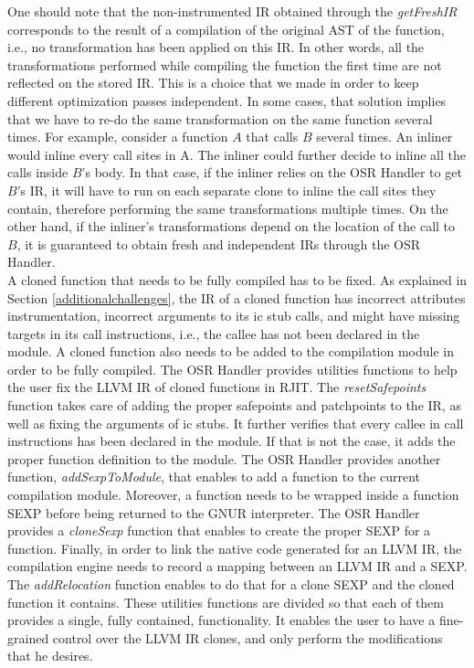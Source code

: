 One should note that the non-instrumented IR obtained through the \textit{getFreshIR} corresponds to the result of a compilation of the original AST of the function, i.e., no transformation has been applied on this IR. 
In other words, all the transformations performed while compiling the function the first time are not reflected on the stored IR. 
This is a choice that we made in order to keep different optimization passes independent.
In some cases, that solution implies that we have to re-do the same transformation on the same function several times.
For example, consider a function $A$ that calls $B$ several times.
An inliner would inline every call sites in A.
The inliner could further decide to inline all the calls inside $B$'s body.
In that case, if the inliner relies on the OSR Handler to get $B$'s IR, it will have to run on each separate clone to inline the call sites they contain, therefore performing the same transformations multiple times.
On the other hand, if the inliner's transformations depend on the location of the call to $B$, it is guaranteed to obtain fresh and independent IRs through the OSR Handler.\\

A cloned function that needs to be fully compiled has to be fixed.
As explained in Section \ref{additionalchallenges}, the IR of a cloned function has incorrect attributes instrumentation, incorrect arguments to its ic stub calls, and might have missing targets in its call instructions, i.e., the callee has not been declared in the module.
A cloned function also needs to be added to the compilation module in order to be fully compiled.
The OSR Handler provides utilities functions to help the user fix the LLVM IR of cloned functions in RJIT. 
The \textit{resetSafepoints} function takes care of adding the proper safepoints and patchpoints to the IR, as well as fixing the arguments of ic stubs.
It further verifies that every callee in call instructions has been declared in the module. 
If that is not the case, it adds the proper function definition to the module.
The OSR Handler provides another function, \textit{addSexpToModule}, that enables to add a function to the current compilation module.
Moreover, a function needs to be wrapped inside a function SEXP before being returned to the GNUR interpreter.
The OSR Handler provides a \textit{cloneSexp} function that enables to create the proper SEXP for a function. 
Finally, in order to link the native code generated for an LLVM IR, the compilation engine needs to record a mapping between an LLVM IR and a SEXP. 
The \textit{addRelocation} function enables to do that for a clone SEXP and the cloned function it contains.
These utilities functions are divided so that each of them provides a single, fully contained, functionality. 
It enables the user to have a fine-grained control over the LLVM IR clones, and only perform the modifications that he desires.\\


